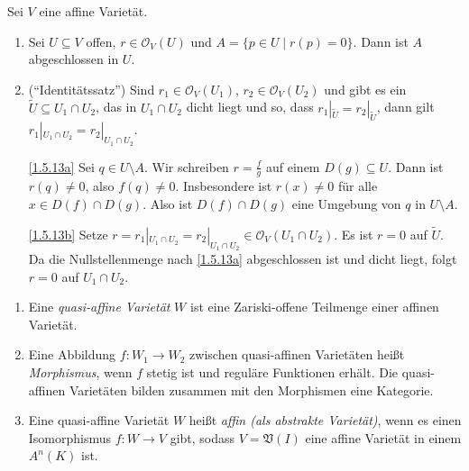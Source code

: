 \documentclass[a4paper,12pt]{scrbook}
\makeatletter
\theoremstyle{blah}
\theoremstyle{stz}
\renewcommand{\proofname}{Beweis}
\renewenvironment{proof}[1][\proofname]{\par
  \pushQED{\qed}%
  \normalfont \topsep6\p@\@plus6\p@\relax
  \trivlist
  \item[\hskip\labelsep
        \itshape
    #1\@addpunct{:}]\ignorespaces
}{%
  \popQED\endtrivlist\@endpefalse
}
\def\V{\mathfrak{V}}
\def\O{\mathcal{O}}
\newcommand{\ra}{\longrightarrow}
\newcommand{\restrict}[1]{|_{#1}}
\makeatother
\begin{document}
\begin{bem}\label{1.5.13}
  Sei $V$ eine affine Varietät.
  \begin{enumerate}
  \item\label{1.5.13a} Sei $U\subseteq V$ offen, $r\in\O_V(U)$ und $A=\{p\in U\mid r(p)=0\}$. Dann ist $A$ abgeschlossen in $U$.
  \item\label{1.5.13b} (\enquote{Identitätssatz}) Sind $r_1\in\O_V(U_1)$, $r_2\in\O_V(U_2)$ und gibt es ein $\tilde{U}\subseteq
    U_1\cap U_2$, das in $U_1\cap U_2$ dicht liegt und so, dass $r_1\restrict{\tilde{U}}=r_2\restrict{\tilde{U}}$, dann gilt
    $r_1\restrict{U_1\cap U_2}=r_2\restrict{U_1\cap U_2}$.
  \end{enumerate}
\end{bem}
\begin{proof}
  \begin{enumerate}
  \item[\ref{1.5.13a}] Sei $q\in U\setminus A$. Wir schreiben $r=\frac{f}{g}$ auf einem $D(g)\subseteq U$. Dann ist $r(q)\neq0$,
    also $f(q)\neq0$. Insbesondere ist $r(x)\neq0$ für alle $x\in D(f)\cap D(g)$. Also ist $D(f)\cap D(g)$ eine Umgebung von $q$
    in $U\setminus A$.
  \item[\ref{1.5.13b}] Setze $r=r_1\restrict{U_1\cap U_2}=r_2\restrict{U_1\cap U_2}\in \O_V(U_1\cap U_2)$. Es ist $r=0$ auf
    $\tilde{U}$. Da die Nullstellenmenge nach \ref{1.5.13a} abgeschlossen ist und dicht liegt, folgt $r=0$ auf $U_1\cap U_2$.
  \end{enumerate}
\end{proof}

\begin{db}\label{1.5.14}
  \begin{enumerate}
  \item\label{1.5.14i} Eine \emph{quasi-affine Varietät} $W$ ist eine Zariski-offene Teilmenge einer affinen Varietät.
  \item\label{1.5.14ii} Eine Abbildung $f\colon W_1\ra W_2$ zwischen quasi-affinen Varietäten heißt \emph{Morphismus}, wenn $f$
    stetig ist und reguläre Funktionen erhält. Die quasi-affinen Varietäten bilden zusammen mit den Morphismen eine Kategorie.
  \item\label{1.5.14iii} Eine quasi-affine Varietät $W$ heißt \emph{affin (als abstrakte Varietät)}, wenn es einen Isomorphismus
    $f\colon W\ra V$ gibt, sodass $V=\V(I)$ eine affine Varietät in einem $A^n(K)$ ist.
  \end{enumerate}
\end{db}
\end{document}
